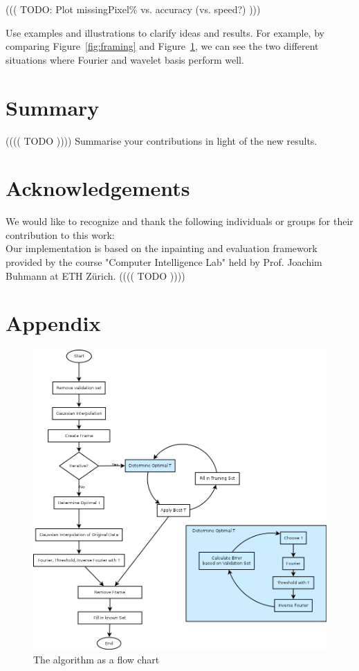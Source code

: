 \documentclass[10pt,conference,compsocconf]{IEEEtran}
\begin{document}
((( TODO: Plot missingPixel\% vs. accuracy (vs. speed?) )))

Use examples and illustrations to clarify ideas and results. For
example, by comparing Figure~\ref{fig:framing} and
Figure~\ref{fig:flowchart}, we can see the two different
situations where Fourier and wavelet basis perform well. 

\section{Summary}
(((( TODO ))))
  Summarise your contributions in light of the new
  results.
  

\section*{Acknowledgements}
We would like to recognize and thank the following individuals or groups for their contribution to this work:\\
Our implementation is based on the inpainting and evaluation framework provided by the course "Computer Intelligence Lab" held by Prof. Joachim Buhmann at ETH Zürich.
(((( TODO ))))





\clearpage
\section{Appendix}
\begin{figure}[htbp]
  \centering
  \includegraphics[width=\textwidth]{images/flowchart}
  \caption{The algorithm as a flow chart}
  \label{fig:flowchart}
\end{figure}
\end{document}
